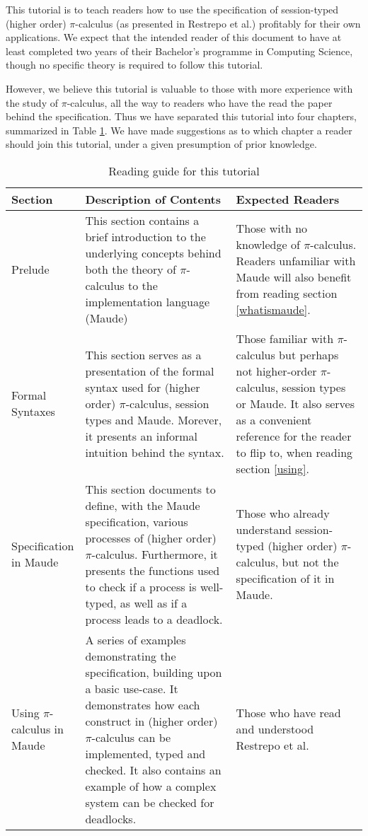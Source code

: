 This tutorial is to teach readers how to use the specification of session-typed (higher order) $\pi$-calculus (as presented in Restrepo et al.\cite{main}) profitably for their own applications. We expect that the intended reader of this document to have at least completed two years of their Bachelor's programme in Computing Science, though no specific theory is required to follow this tutorial.

However, we believe this tutorial is valuable to those with more experience with the study of $\pi$-calculus, all the way to readers who have the read the paper behind the specification. Thus we have separated this tutorial into four chapters, summarized in Table \ref{suggestedreading}. We have made suggestions as to which chapter a reader should join this tutorial, under a given presumption of prior knowledge.

\begin{table}[H]
\centering
\bgroup
\def\arraystretch{1.5}
\begin{tabular}{|>{\raggedright}m{0.16\linewidth} | m{0.45\linewidth} | m{0.4\linewidth}|}
\hline
\textbf{Section} & \textbf{Description of Contents} & \textbf{Expected Readers} \\ \hline

Prelude & This section contains a brief introduction to the underlying concepts behind both the theory of $\pi$-calculus to the implementation language (Maude) & Those with no knowledge of $\pi$-calculus. Readers unfamiliar with Maude will also benefit from reading section \ref{whatismaude}.\\ \hline
Formal Syntaxes & This section serves as a presentation of the formal syntax used for (higher order) $\pi$-calculus, session types and Maude. Morever, it presents an informal intuition behind the syntax. & Those familiar with $\pi$-calculus but perhaps not higher-order $\pi$-calculus, session types or Maude. It also serves as a convenient reference for the reader to flip to, when reading section \ref{using}.\\ \hline
Specification in Maude & This section documents to define, with the Maude specification, various processes of (higher order) $\pi$-calculus. Furthermore, it presents the functions used to check if a process is well-typed, as well as if a process leads to a deadlock. & Those who already understand session-typed (higher order) $\pi$-calculus, but not the specification of it in Maude. \\ \hline
Using $\pi$-calculus in Maude & A series of examples demonstrating the specification, building upon a basic use-case. It demonstrates how each construct in (higher order) $\pi$-calculus can be implemented, typed and checked. It also contains an example of how a complex system can be checked for deadlocks. & Those who have read and understood Restrepo et al. \cite{main} \\ \hline

\hline
\end{tabular}
\egroup
\caption{\label{suggestedreading} Reading guide for this tutorial}
\end{table}

